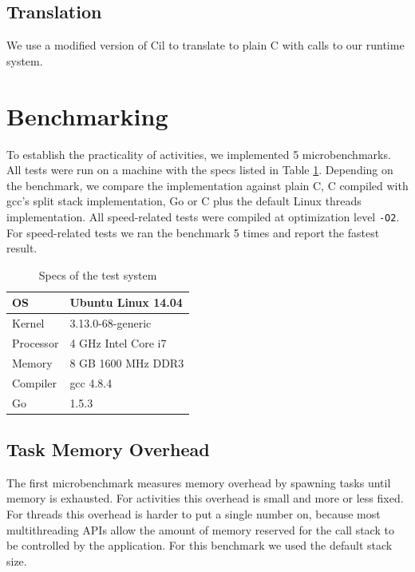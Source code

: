 \documentclass[9pt,preprint]{sigplanconf}
\begin{document}
\subsection{Translation}

We use a modified version of Cil \cite{Necula2002} to translate \charcoal{} to plain C with calls to our runtime system.

\section{Benchmarking}

To establish the practicality of activities, we implemented 5 microbenchmarks.
All tests were run on a machine with the specs listed in Table \ref{table:specs}.
Depending on the benchmark, we compare the \charcoal{} implementation against plain C, C compiled with gcc's split stack implementation, Go or C plus the default Linux threads implementation.
All speed-related tests were compiled at optimization level \texttt{-O2}.
For speed-related tests we ran the benchmark 5 times and report the fastest result.

\begin{table}
  \centering
  \begin{tabular}{|l|l|}
    \hline
    OS & Ubuntu Linux 14.04 \\
    \hline
    Kernel & 3.13.0-68-generic \\
    \hline
    Processor & 4 GHz Intel Core i7 \\
    \hline
    Memory & 8 GB 1600 MHz DDR3 \\
    \hline
    Compiler & gcc 4.8.4 \\
    \hline
    Go & 1.5.3 \\
    \hline
  \end{tabular}
  \caption{Specs of the test system}
  \label{table:specs}
\end{table}

\subsection{Task Memory Overhead}

The first microbenchmark measures memory overhead by spawning tasks until memory is exhausted.
For activities this overhead is small and more or less fixed.
For threads this overhead is harder to put a single number on, because most multithreading APIs allow the amount of memory reserved for the call stack to be controlled by the application.
For this benchmark we used the default stack size.
\end{document}
